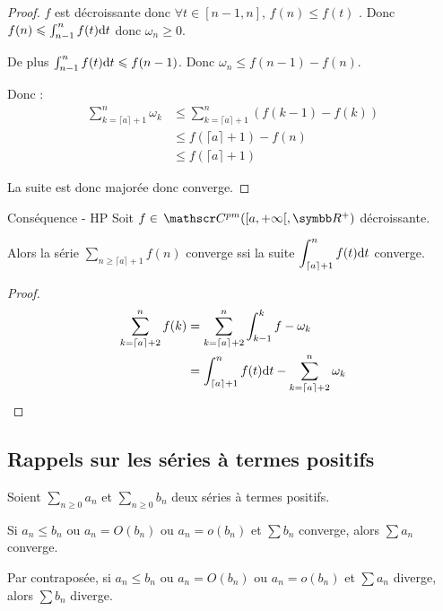 \begin{proof}
    $f$ est décroissante donc $\forall t \in [n - 1, n], \, f(n) \leqslant f(t)$ .
    Donc $f(n) \leqslant \int_{n - 1}^{n} f(t) \text d t$ donc $\omega_n \geqslant 0$.

    De plus $\int_{n - 1 }^{n } f(t) \text d t \leqslant f(n - 1)$. Donc $\omega_n \leqslant f(n - 1 ) - f(n)$.

    Donc :
    \begin{align*}
        \sum_{k = \lceil a \rceil + 1}^{n} \omega_k & \leqslant \sum_{k = \lceil a \rceil + 1}^{n } (f(k - 1) - f(k)) \\
                                                        & \leqslant f(\lceil a \rceil + 1) - f(n) \\
                                                        & \leqslant f(\lceil a \rceil + 1)
    \end{align*}

    La suite est donc majorée donc converge. 
\end{proof}

\begin{proposition}{Conséquence - HP}{}
    Soit $f \in \mc{pm}([a, + \infty[, \R^+)$ décroissante. 

    Alors la série $\displaystyle \sum_{n \geqslant \lceil a \rceil + 1} f(n)$ converge ssi la suite 
    $\displaystyle \int_{\lceil a \rceil + 1 }^{n } f(t) \text d t$ converge.
\end{proposition}

\begin{proof}
    \begin{align*}
        \sum_{k = \lceil a \rceil + 2}^{n} f(k) & = \sum_{k = \lceil a \rceil + 2}^{n} \int_{k - 1 }^{k} f- \omega_k \\
                                                & = \int_{\lceil a \rceil + 1}^{n} f(t) \text d t - \sum_{k = \lceil a \rceil + 2}^{n} \omega_k                                 
    \end{align*}
\end{proof}

\subsection{Rappels sur les séries à termes positifs}

\begin{theoreme}{}{}
    Soient $\sum_{n \geqslant 0 } a_n$ et $\sum_{n \geqslant 0} b_n$ deux séries à termes positifs.

    \vspace{0.2mm}
    Si $a_n \leqslant b_n$ ou $a_n = O(b_n)$ ou $a_n = o(b_n)$
    et $\sum b_n$ converge, alors $\sum a_n$ converge.

    \svspace Par contraposée, si 
    $a_n \leqslant b_n$ ou
    $a_n = O(b_n)$ ou
    $a_n = o(b_n)$ 
    et $\sum a_n$ diverge, alors $\sum b_n$ diverge. 
\end{theoreme}

